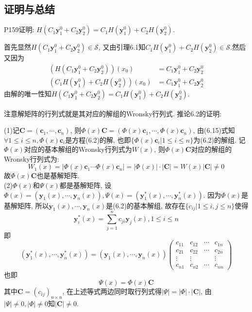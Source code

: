 \documentclass[titlepage,11pt,a4paper,twoside]{report}
\makeatletter
\newcommand\bmitPhi{\bm{\varPhi}}
\newcommand\bmitPsi{\bm{\varPsi}}
\renewenvironment{proof}{\par
	\pushQED{\qed}%
	\normalfont \topsep1\p@\@plus6\p@\relax
	\trivlist
	\item\relax
	{\hspace*{\parindent}{\heiti 证明}\@addpunct{:}}\hspace\labelsep\ignorespaces
}{%
	\popQED\endtrivlist\@endpefalse
}
\makeatother
\begin{document}
\subsection{证明与总结}
P159证明: $H(C_1\bm{y}_1^0+C_2\bm{y}_2^0)=C_1H(\bm{y}_1^0)+C_2H(\bm{y}_2^0)$.
\begin{proof} 首先显然$H(C_1\bm{y}_1^0+C_2\bm{y}_2^0)\in\mathcal{S}$, 又由引理6.1知$C_1H(\bm{y}_1^0)+C_2H(\bm{y}_2^0)\in\mathcal{S}$.然后又因为
\[\begin{split}\left(H(C_1\bm{y}_1^0+C_2\bm{y}_2^0)\right)(x_0)&=C_1\bm{y}_1^0+C_2\bm{y}_2^0\\
\left(C_1H(\bm{y}_1^0)+C_2H(\bm{y}_2^0)\right)(x_0)&=C_1\bm{y}_1^0+C_2\bm{y}_2^0
\end{split}\]
由解的唯一性知$H(C_1\bm{y}_1^0+C_2\bm{y}_2^0)=C_1H(\bm{y}_1^0)+C_2H(\bm{y}_2^0)$.\\\\
注意解矩阵的行列式就是其对应的解组的Wronsky行列式.
\end{proof}
推论6.2的证明:
\begin{proof}
(1)记$\bm{C}=(\bm{c}_1,\cdots,\bm{c}_n)$, 则$\bm{\varPhi}(x)\bm{C}=(\bm{\varPhi}(x)\bm{c}_1,\cdots,\bm{\varPhi}(x)\bm{c}_n)$, 由(6.15)式知$\forall1\leq i\leq n,\bm{\varPhi}(x)\bm{c}_i$是方程(6.2)的解, 也即$\{\bm{\varPhi}(x)\bm{c}_i|1\leq i\leq n\}$为(6.2)的解组. 记$\bmitPhi(x)$对应的基本解组的Wronsky行列式为$W(x)$, 则$\bmitPhi(x)\bm{C}$对应的解组的Wronsky行列式为:
\[W_1(x)=|\bmitPhi(x)\bm{c}_1\cdots\bmitPhi(x)\bm{c}_n|=|\bmitPhi(x)|\cdot|\bm{C}|=W(x)|\bm{C}|\neq0\]
故$\bmitPhi(x)\bm{C}$也是基解矩阵.\\
(2)$\bmitPhi(x)$和$\bmitPsi(x)$都是基解矩阵, 设$\bmitPhi(x)=(\bm{y}_1(x),\cdots,\bm{y}_n(x)),\bmitPsi(x)=(\bm{y}_1^*(x),\cdots,\bm{y}_n^*(x))$. 因为$\bmitPhi(x)$是基解矩阵, 所以$\bm{y}_1(x),\cdots,\bm{y}_n(x)$是(6.2)的基本解组, 故存在$\{c_{ij}|1\leq i,j\leq n\}$使得\[\bm{y}_i^*(x)=\sum_{j=1}^nc_{ji}\bm{y}_j(x),1\leq i\leq n\]
即\[(\bm{y}_1^*(x),\cdots,\bm{y}_n^*(x))=(\bm{y}_1(x),\cdots,\bm{y}_n(x))
\begin{pmatrix}
c_{11}&c_{12}&\cdots&c_{1n}\\
c_{21}&c_{22}&\cdots&c_{2n}\\
\vdots&\vdots&&\vdots\\
c_{n1}&c_{n2}&\cdots&c_{nn}
\end{pmatrix}\]
也即\[\bmitPsi(x)=\bmitPhi(x)\bm{C}\]
其中$\bm{C}=(c_{ij})_{n\times n}$, 在上述等式两边同时取行列式得$|\bmitPsi|=|\bmitPhi|\cdot|\bm{C}|$, 由$|\bmitPsi|\neq0,|\bmitPhi|\neq0$知$|\bm{C}|\neq0$.
\end{proof}
\end{document}
